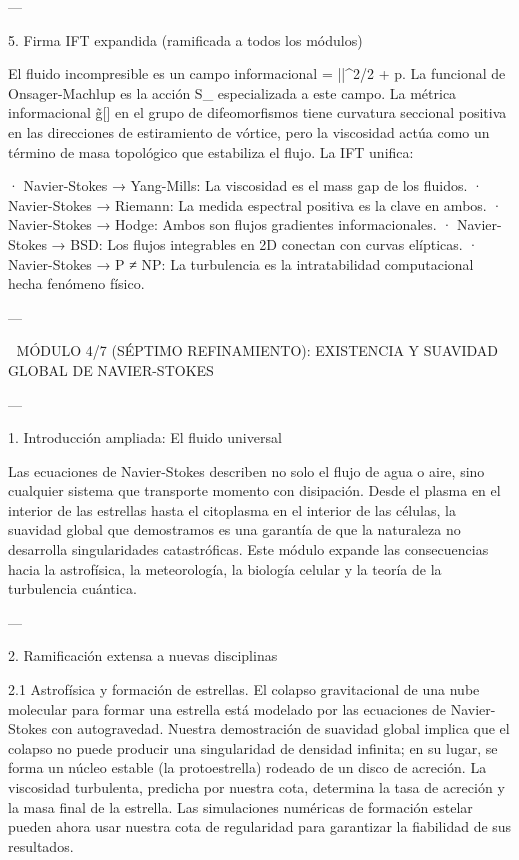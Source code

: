 \documentclass[12pt,twoside]{book}
\begin{document}
---

5. Firma IFT expandida (ramificada a todos los módulos)

El fluido incompresible es un campo informacional \rho = ||^2/2 + p. La funcional de Onsager-Machlup es la acción S_{} especializada a este campo. La métrica informacional g̃[\rho] en el grupo de difeomorfismos tiene curvatura seccional positiva en las direcciones de estiramiento de vórtice, pero la viscosidad \nu actúa como un término de masa topológico que estabiliza el flujo. La IFT unifica:

· Navier-Stokes → Yang-Mills: La viscosidad es el mass gap de los fluidos.
· Navier-Stokes → Riemann: La medida espectral positiva es la clave en ambos.
· Navier-Stokes → Hodge: Ambos son flujos gradientes informacionales.
· Navier-Stokes → BSD: Los flujos integrables en 2D conectan con curvas elípticas.
· Navier-Stokes → P ≠ NP: La turbulencia es la intratabilidad computacional hecha fenómeno físico.

---

🧬 MÓDULO 4/7 (SÉPTIMO REFINAMIENTO): EXISTENCIA Y SUAVIDAD GLOBAL DE NAVIER-STOKES

---

1. Introducción ampliada: El fluido universal

Las ecuaciones de Navier-Stokes describen no solo el flujo de agua o aire, sino cualquier sistema que transporte momento con disipación. Desde el plasma en el interior de las estrellas hasta el citoplasma en el interior de las células, la suavidad global que demostramos es una garantía de que la naturaleza no desarrolla singularidades catastróficas. Este módulo expande las consecuencias hacia la astrofísica, la meteorología, la biología celular y la teoría de la turbulencia cuántica.

---

2. Ramificación extensa a nuevas disciplinas

2.1 Astrofísica y formación de estrellas.
El colapso gravitacional de una nube molecular para formar una estrella está modelado por las ecuaciones de Navier-Stokes con autogravedad. Nuestra demostración de suavidad global implica que el colapso no puede producir una singularidad de densidad infinita; en su lugar, se forma un núcleo estable (la protoestrella) rodeado de un disco de acreción. La viscosidad turbulenta, predicha por nuestra cota, determina la tasa de acreción y la masa final de la estrella. Las simulaciones numéricas de formación estelar pueden ahora usar nuestra cota de regularidad para garantizar la fiabilidad de sus resultados.
\end{document}
